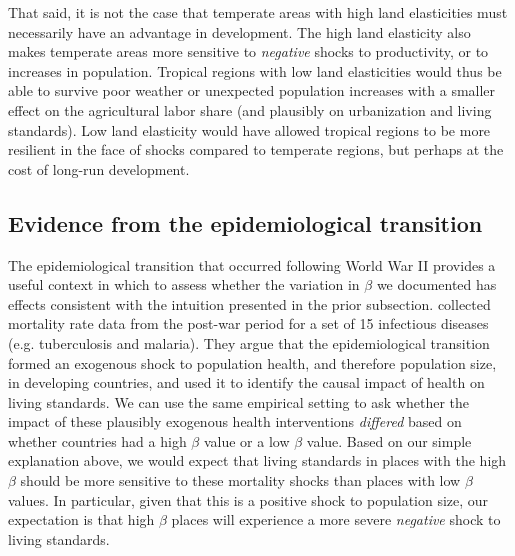 \documentclass[11pt]{article}
\begin{document}
That said, it is not the case that temperate areas with high land elasticities must necessarily have an advantage in development. The high land elasticity also makes temperate areas more sensitive to \textit{negative} shocks to productivity, or to increases in population. Tropical regions with low land elasticities would thus be able to survive poor weather or unexpected population increases with a smaller effect on the agricultural labor share (and plausibly on urbanization and living standards). Low land elasticity would have allowed tropical regions to be more resilient in the face of shocks compared to temperate regions, but perhaps at the cost of long-run development.

\subsection{Evidence from the epidemiological transition}\label{SEC_ajtest}
The epidemiological transition that occurred following World War II provides a useful context in which to assess whether the variation in $\beta$ we documented has effects consistent with the intuition presented in the prior subsection. \cite{aj07} collected mortality rate data from the post-war period for a set of 15 infectious diseases (e.g. tuberculosis and malaria). They argue that the epidemiological transition formed an exogenous shock to population health, and therefore population size, in developing countries, and used it to identify the causal impact of health on living standards. We can use the same empirical setting to ask whether the impact of these plausibly exogenous health interventions \textit{differed} based on whether countries had a high $\beta$ value or a low $\beta$ value. Based on our simple explanation above, we would expect that living standards in places with the high $\beta$ should be more sensitive to these mortality shocks than places with low $\beta$ values. In particular, given that this is a positive shock to population size, our expectation is that high $\beta$ places will experience a more severe \textit{negative} shock to living standards.
\end{document}
